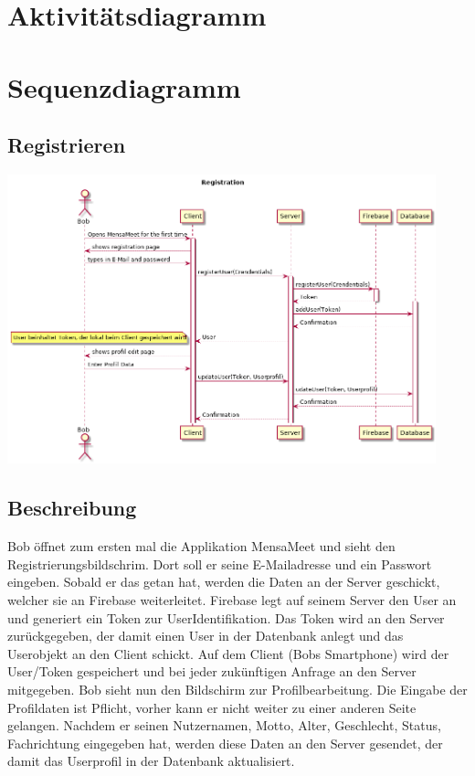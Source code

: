 \documentclass[a4paper]{scrreprt}
\begin{document}
\section{Aktivitätsdiagramm}

\section{Sequenzdiagramm}
\subsection{Registrieren}
\begin{center}
	\includegraphics[width=0.93\textwidth]{Sequenzdiagramme/Registration.png}
\end{center}
\subsection*{Beschreibung}
Bob öffnet zum ersten mal die Applikation MensaMeet und sieht den Registrierungsbildschrim. Dort soll er seine E-Mailadresse und ein Passwort eingeben. Sobald er das getan hat, werden die Daten an der Server geschickt, welcher sie an Firebase weiterleitet. Firebase legt auf seinem Server den User an und generiert ein Token zur UserIdentifikation. Das Token wird an den Server zurückgegeben, der damit einen User in der Datenbank anlegt und das Userobjekt an den Client schickt. Auf dem Client (Bobs Smartphone) wird der User/Token gespeichert und bei jeder zukünftigen Anfrage an den Server mitgegeben. 
Bob sieht nun den Bildschirm zur Profilbearbeitung. Die Eingabe der Profildaten ist Pflicht, vorher kann er nicht weiter zu einer anderen Seite gelangen.
Nachdem er seinen Nutzernamen, Motto, Alter, Geschlecht, Status, Fachrichtung eingegeben hat, werden diese Daten an den Server gesendet, der damit das Userprofil in der Datenbank aktualisiert. 
\newpage
\end{document}
